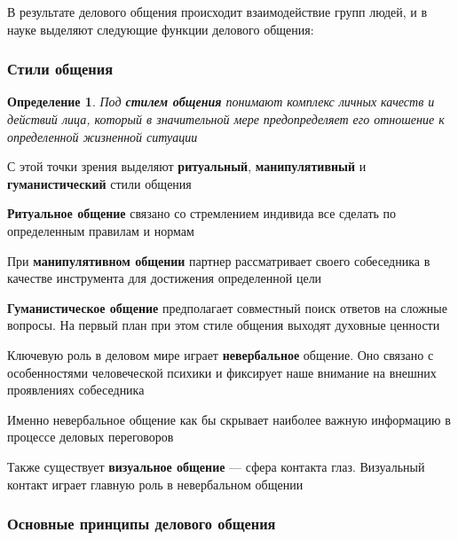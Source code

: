 \documentclass{article}
\newtheorem{definition}{Определение}
\begin{document}
В результате делового общения происходит взаимодействие групп людей, и в науке выделяют следующие функции делового общения:

\begin{multienumerate}
\end{multienumerate}

\subsubsection{Стили общения}

\begin{definition}
    Под \textbf{стилем общения} понимают комплекс личных качеств и действий лица, который в значительной мере предопределяет его отношение к определенной жизненной ситуации
\end{definition}

С этой точки зрения выделяют \textbf{ритуальный}, \textbf{манипулятивный} и \textbf{гуманистический} стили общения

\hfill

\textbf{Ритуальное общение} связано со стремлением индивида все сделать по определенным правилам и нормам

При \textbf{манипулятивном общении} партнер рассматривает своего собеседника в качестве инструмента для достижения определенной цели

\textbf{Гуманистическое общение} предполагает совместный поиск ответов на сложные вопросы. На первый план при этом стиле общения выходят духовные ценности

\hfill

Ключевую роль в деловом мире играет \textbf{невербальное} общение. Оно связано с особенностями человеческой психики и фиксирует наше внимание на внешних проявлениях собеседника

Именно невербальное общение как бы скрывает наиболее важную информацию в процессе деловых переговоров

Также существует \textbf{визуальное общение} — сфера контакта глаз. Визуальный контакт играет главную роль в невербальном общении

\subsubsection{Основные принципы делового общения}
\end{document}
